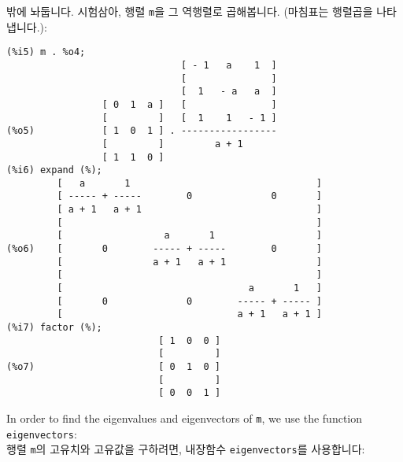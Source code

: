\documentclass[a4paper,12pt]{article}
\begin{document}
밖에 놔둡니다. 시험삼아, 행렬 {\tt m}을 그 역행렬로 곱해봅니다. 
(마침표는 행렬곱을 나타냅니다.):
\begin{verbatim}
(%i5) m . %o4;
                               [ - 1   a    1  ]
                               [               ]
                               [  1   - a   a  ]
                 [ 0  1  a ]   [               ]
                 [         ]   [  1    1   - 1 ]
(%o5)            [ 1  0  1 ] . -----------------
                 [         ]         a + 1
                 [ 1  1  0 ]
(%i6) expand (%);
         [   a       1                                 ]
         [ ----- + -----        0              0       ]
         [ a + 1   a + 1                               ]
         [                                             ]
         [                  a       1                  ]
(%o6)    [       0        ----- + -----        0       ]
         [                a + 1   a + 1                ]
         [                                             ]
         [                                 a       1   ]
         [       0              0        ----- + ----- ]
         [                               a + 1   a + 1 ]
(%i7) factor (%);
                           [ 1  0  0 ]
                           [         ]
(%o7)                      [ 0  1  0 ]
                           [         ]
                           [ 0  0  1 ]
\end{verbatim}
In order to find the eigenvalues and eigenvectors of {\tt m}, we use the function {\tt
eigenvectors}: \\
행렬 {\tt m}의 고유치와 고유값을 구하려면, 내장함수 {\tt eigenvectors}를 사용합니다:
\end{document}
